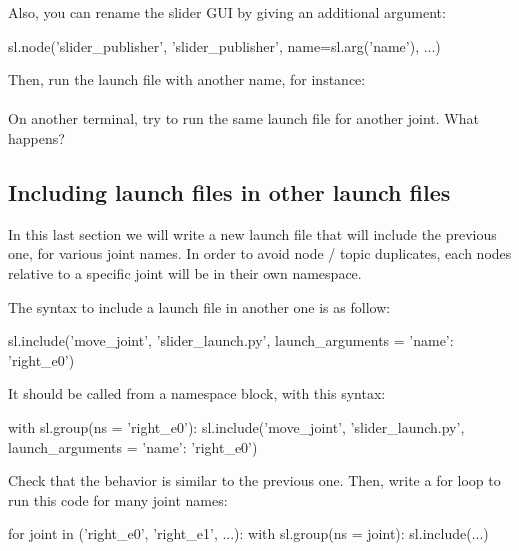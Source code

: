 \documentclass{ecnreport}
\begin{document}
Also, you can rename the slider GUI by giving an additional argument:
\begin{pythoncodelarge}
sl.node('slider_publisher', 'slider_publisher', name=sl.arg('name'), ...)
\end{pythoncodelarge}

Then, run the launch file with another name, for instance:\\ \\
On another terminal, try to run the same launch file for another joint. What happens?\\



\subsection{Including launch files in other launch files}

In this last section we will write a new launch file that will include the previous one, for various joint names. In order to avoid node / topic duplicates, each nodes relative to a specific joint will be in their own namespace. 

The syntax to include a launch file in another one is as follow:
\begin{pythoncodelarge}
sl.include('move_joint', 'slider_launch.py', launch_arguments = {'name': 'right_e0'})
\end{pythoncodelarge}

It should be called from a namespace block, with this syntax:
\begin{pythoncodelarge}
with sl.group(ns = 'right_e0'):
  sl.include('move_joint', 'slider_launch.py', launch_arguments = {'name': 'right_e0'})
\end{pythoncodelarge}

Check that the behavior is similar to the previous one. Then, write a for loop to run this code for many joint names:
\begin{pythoncodelarge}
for joint in ('right_e0', 'right_e1', ...):
    with sl.group(ns = joint):
        sl.include(...)
\end{pythoncodelarge}
\end{document}
